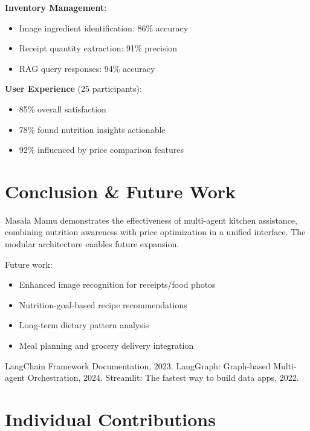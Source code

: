 \documentclass{ecai}
\begin{document}
\textbf{Inventory Management}:
\begin{itemize}[noitemsep,topsep=0pt]
    \item Image ingredient identification: 86\% accuracy
    \item Receipt quantity extraction: 91\% precision
    \item RAG query responses: 94\% accuracy
\end{itemize}

\textbf{User Experience} (25 participants):
\begin{itemize}[noitemsep,topsep=0pt]
    \item 85\% overall satisfaction
    \item 78\% found nutrition insights actionable
    \item 92\% influenced by price comparison features
\end{itemize}

\section{Conclusion \& Future Work}

Masala Mamu demonstrates the effectiveness of multi-agent kitchen assistance, combining nutrition awareness with price optimization in a unified interface. The modular architecture enables future expansion.

Future work:
\begin{itemize}[noitemsep,topsep=0pt]
    \item Enhanced image recognition for receipts/food photos
    \item Nutrition-goal-based recipe recommendations
    \item Long-term dietary pattern analysis
    \item Meal planning and grocery delivery integration
\end{itemize}


\begin{thebibliography}{9}
 LangChain Framework Documentation, 2023.
 LangGraph: Graph-based Multi-agent Orchestration, 2024.
 Streamlit: The fastest way to build data apps, 2022.
\end{thebibliography}

\clearpage
\section*{Individual Contributions}
\end{document}
